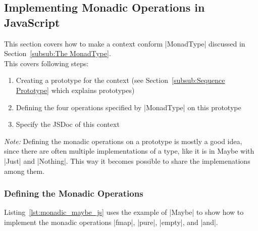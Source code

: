 \subsection{Implementing Monadic Operations in JavaScript} %
\label{sub:Implementing Monadic Operations in JavaScript}
This section covers how to make a context conform |MonadType| discussed in
Section~\ref{subsub:The MonadType}.\\ 
This covers following steps:
\begin{enumerate}
  \item Creating a prototype for the context (see Section~\ref{subsub:Sequence
    Prototype} which explains prototypes)
  \item Defining the four operations specified by |MonadType| on this prototype
  \item Specify the JSDoc of this context
\end{enumerate}

\textit{Note:} Defining the monadic operations on a prototype is mostly a good
idea, since there are often multiple implementations of a type, like it is in
Maybe with |Just| and |Nothing|. This way it becomes possible to share the
implemenations among them.
\subsubsection{Defining the Monadic Operations} %
\label{sec:Defining the Monadic Operations}
Listing~\ref{lst:monadic_maybe_js} uses the example of |Maybe| to show how to
implement the monadic operations |fmap|, |pure|, |empty|, and |and|.

